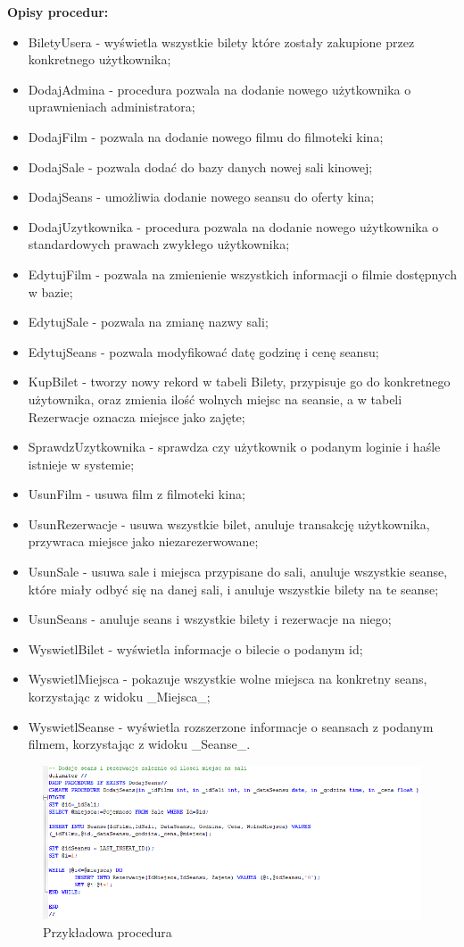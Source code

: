 \textbf{Opisy procedur:}
\begin{itemize}
	\item BiletyUsera - wyświetla wszystkie bilety które zostały zakupione przez konkretnego użytkownika;
	\item DodajAdmina - procedura pozwala na dodanie nowego użytkownika o uprawnieniach administratora;
	\item DodajFilm - pozwala na dodanie nowego filmu do filmoteki kina;
	\item DodajSale - pozwala dodać do bazy danych nowej sali kinowej;
	\item DodajSeans - umożliwia dodanie nowego seansu do oferty kina;
	\item DodajUzytkownika - procedura pozwala na dodanie nowego użytkownika o standardowych prawach zwykłego użytkownika;
	\item EdytujFilm - pozwala na zmienienie wszystkich informacji o filmie dostępnych w bazie;
	\item EdytujSale - pozwala na zmianę nazwy sali;
	\item EdytujSeans - pozwala modyfikować datę godzinę i cenę seansu;
	\item KupBilet - tworzy nowy rekord w tabeli Bilety, przypisuje go do konkretnego użytownika, oraz zmienia ilość wolnych miejsc na seansie, a w tabeli Rezerwacje oznacza miejsce jako zajęte;
	\item SprawdzUzytkownika - sprawdza czy użytkownik o podanym loginie i haśle istnieje w systemie;
	\item UsunFilm - usuwa film z filmoteki kina;
	\item UsunRezerwacje - usuwa wszystkie bilet, anuluje transakcję użytkownika, przywraca miejsce jako niezarezerwowane;
	\item UsunSale - usuwa sale i miejsca przypisane do sali, anuluje wszystkie seanse, które miały odbyć się na danej sali, i anuluje wszystkie bilety na te seanse;
	\item UsunSeans - anuluje seans i wszystkie bilety i rezerwacje na niego;
	\item WyswietlBilet - wyświetla informacje o bilecie o podanym id;
	\item WyswietlMiejsca - pokazuje wszystkie wolne miejsca na konkretny seans, korzystając z widoku \_Miejsca\_;
	\item WyswietlSeanse - wyświetla rozszerzone informacje o seansach z podanym filmem, korzystając z widoku \_Seanse\_.
\end{itemize}

\begin{figure} [H]
	\centering
	\includegraphics[width=1\linewidth]{rozdzial04/P_DodajSeans.png}
	\caption{Przykładowa procedura}
	\label{fig:p_DodajSeans}
\end{figure}